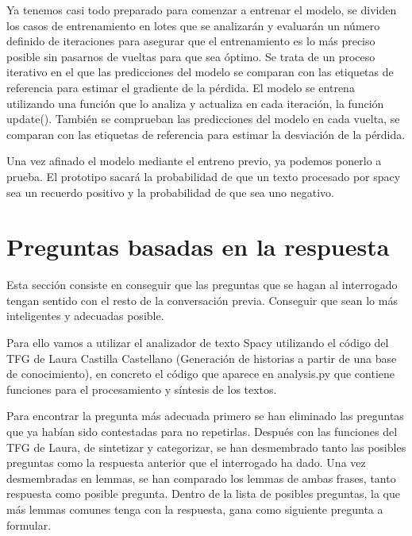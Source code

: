 Ya tenemos casi todo preparado para comenzar a entrenar el modelo, se dividen los casos de entrenamiento en lotes que se analizarán y evaluarán un número definido de iteraciones para asegurar que el entrenamiento es lo más preciso posible sin pasarnos de vueltas para que sea óptimo. Se trata de un proceso iterativo en el que las predicciones del modelo se comparan con las etiquetas de referencia para estimar el gradiente de la pérdida. El modelo se entrena utilizando una función que lo analiza y actualiza en cada iteración, la función update(). También se comprueban las predicciones del modelo en cada vuelta, se comparan con las etiquetas de referencia para estimar la desviación de la pérdida.

Una vez afinado el modelo mediante el entreno previo, ya podemos ponerlo a prueba. El prototipo sacará la probabilidad de que un texto procesado por spacy sea un recuerdo positivo y la probabilidad de que sea uno negativo. 

\section{Preguntas basadas en la respuesta}
Esta sección consiste en conseguir que las preguntas que se hagan al interrogado tengan sentido con el resto de la conversación previa. Conseguir que sean lo más inteligentes y adecuadas posible.

Para ello vamos a utilizar el analizador de texto Spacy utilizando el código del TFG de Laura Castilla Castellano (Generación de historias a partir de una base de conocimiento), en concreto el código que aparece en analysis.py que contiene funciones para el procesamiento y síntesis de los textos.

Para encontrar la pregunta más adecuada primero se han eliminado las preguntas que ya habían sido contestadas para no repetirlas. Después con las funciones del TFG de Laura, de sintetizar y categorizar, se han desmembrado tanto las posibles preguntas como la respuesta anterior que el interrogado ha dado. Una vez desmembradas en lemmas, se han comparado los lemmas de ambas frases, tanto respuesta como posible pregunta. Dentro de la lista de posibles preguntas, la que más lemmas comunes tenga con la respuesta, gana como siguiente pregunta a formular. 
 
